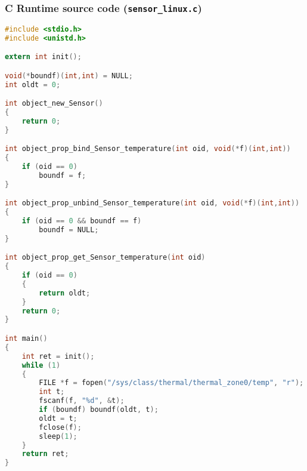 \subsubsection{C Runtime source code (\texttt{sensor\_linux.c})}

\begin{lstlisting}[language=C,backgroundcolor=\color{backgroundcolor}]
#include <stdio.h>
#include <unistd.h>

extern int init();

void(*boundf)(int,int) = NULL;
int oldt = 0;

int object_new_Sensor()
{
	return 0;
}

int object_prop_bind_Sensor_temperature(int oid, void(*f)(int,int))
{
	if (oid == 0)
		boundf = f;
}

int object_prop_unbind_Sensor_temperature(int oid, void(*f)(int,int))
{
	if (oid == 0 && boundf == f)
		boundf = NULL;
}

int object_prop_get_Sensor_temperature(int oid)
{
	if (oid == 0)
	{
		return oldt;
	}
	return 0;
}

int main()
{
	int ret = init();
	while (1)
	{
		FILE *f = fopen("/sys/class/thermal/thermal_zone0/temp", "r");
		int t;
		fscanf(f, "%d", &t);
		if (boundf) boundf(oldt, t);
		oldt = t;
		fclose(f);
		sleep(1);
	}
	return ret;
}
\end{lstlisting}
